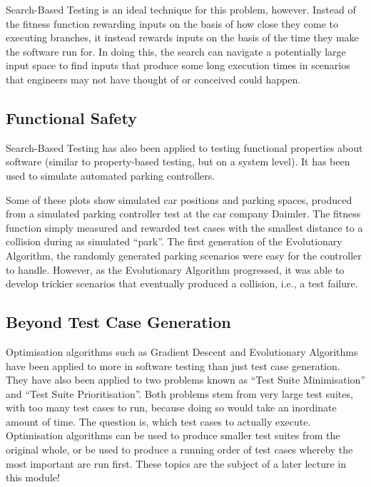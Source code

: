 Search-Based Testing is an ideal technique for this problem, however. Instead of
the fitness function rewarding inputs on the basis of how close they come to
executing branches, it instead rewards inputs on the basis of the time they make
the software run for. In doing this, the search can navigate a potentially large
input space to find inputs that produce some long execution times in scenarios
that engineers may not have thought of or conceived could happen.

\subsection{Functional Safety}

Search-Based Testing has also been applied to testing functional properties
about software (similar to property-based testing, but on a system level). It
has been used to simulate automated parking controllers. 

Some of these plots show simulated car positions and parking spaces, produced
from a simulated parking controller test at the car company Daimler. The fitness
function simply measured and rewarded test cases with the smallest distance to a
collision during as simulated ``park''. The first generation of the Evolutionary
Algorithm, the randomly generated parking scenarios were easy for the controller
to handle. However, as the Evolutionary Algorithm progressed, it was able to
develop trickier scenarios that eventually produced a collision, i.e., a test
failure.


\subsection{Beyond Test Case Generation}

Optimisation algorithms such as Gradient Descent and Evolutionary Algorithms
have been applied to more in software testing than just test case generation.
They have also been applied to two problems known as ``Test Suite Minimisation''
and ``Test Suite Prioritisation''. Both problems stem from very large test
suites, with too many test cases to run, because doing so would take an
inordinate amount of time. The question is, which test cases to actually
execute. Optimisation algorithms can be used to produce smaller test suites from
the original whole, or be used to produce a running order of test cases whereby
the most important are run first. These topics are the subject of a later
lecture in this module!

